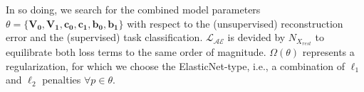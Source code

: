 \documentclass{article} %
\begin{document}
In so doing, we search for the combined model parameters
$\theta=\{\mathbf{V_0,V_1,c_0, c_1, b_0, b_1}\}$
with respect to the (unsupervised) reconstruction error and the
(supervised) task classification.
${\mathcal{L_{AE}}}$ is devided by ${N_{X_{rest}}}$ to equilibrate both
loss terms to the same order of magnitude.
\(\Omega(\theta)\) represents a regularization, for which we choose the
ElasticNet-type, i.e., a combination of $\ell_1$ and $\ell_2$ penalties
$\forall p \in \theta$.

\end{document}
